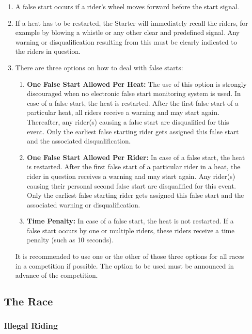 \begin{enumerate}[leftmargin=1.5em,labelsep=*]
	\item A false start occurs if a rider's wheel moves forward before the start signal.
	\item If a heat has to be restarted, the Starter will immediately recall the riders, for example by blowing a whistle or any other clear and predefined signal.
	Any warning or disqualification resulting from this must be clearly indicated to the riders in question.
	\item There are three options on how to deal with false starts:
	\begin{enumerate}[label*=\arabic*,leftmargin=1.5em,labelsep=*]
		\item \textbf{One False Start Allowed Per Heat:}
		The use of this option is strongly discouraged when no electronic false start monitoring system is used.
		In case of a false start, the heat is restarted.
		After the first false start of a particular heat, all riders receive a warning and may start again.
		Thereafter, any rider(s) causing a false start are disqualified for this event.
		Only the earliest false starting rider gets assigned this false start and the associated disqualification.
		\item \textbf{One False Start Allowed Per Rider:}
		In case of a false start, the heat is restarted.
		After the first false start of a particular rider in a heat, the rider in question receives a warning and may start again.
		Any rider(s) causing their personal second false start are disqualified for this event.
		Only the earliest false starting rider gets assigned this
        false start and the associated warning or disqualification.
		\item \textbf{Time Penalty:}
		In case of a false start, the heat is not restarted.
		If a false start occurs by one or multiple riders, these riders receive a time penalty (such as 10 seconds).
	\end{enumerate}
	It is recommended to use one or the other of those three options for all races in a competition if possible.
	The option to be used must be announced in advance of the competition.
\end{enumerate}

\subsection{The Race}

\subsubsection{Illegal Riding}


